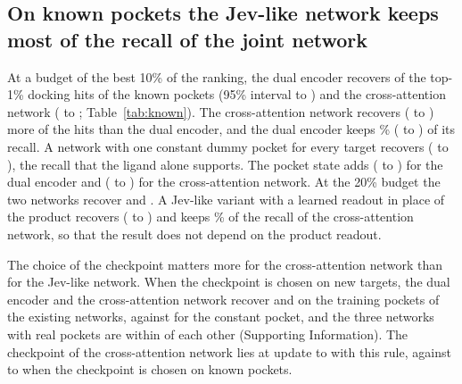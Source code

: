 \subsection{On known pockets the Jev-like network keeps most of the recall of the joint network}

At a budget of the best 10\% of the ranking, the dual encoder recovers \kfDualTen{} of the top-1\% docking hits of the \kfNTargets{} known pockets (95\% interval \kfDualTenLo{} to \kfDualTenHi{}) and the cross-attention network \kfXattnTen{} (\kfXattnTenLo{} to \kfXattnTenHi{}; Table~\ref{tab:known}). The cross-attention network recovers \kfDiffXattnDualTen{} (\kfDiffXattnDualTenLo{} to \kfDiffXattnDualTenHi{}) more of the hits than the dual encoder, and the dual encoder keeps \kfRatioDual{}\% (\kfRatioDualLo{} to \kfRatioDualHi{}) of its recall. A network with one constant dummy pocket for every target recovers \kfConstTen{} (\kfConstTenLo{} to \kfConstTenHi{}), the recall that the ligand alone supports. The pocket state adds \kfDiffDualConstTen{} (\kfDiffDualConstTenLo{} to \kfDiffDualConstTenHi{}) for the dual encoder and \kfDiffXattnXattnConstTen{} (\kfDiffXattnXattnConstTenLo{} to \kfDiffXattnXattnConstTenHi{}) for the cross-attention network. At the 20\% budget the two networks recover \kfDualTwenty{} and \kfXattnTwenty{}. A Jev-like variant with a learned readout in place of the product recovers \kfPooledTen{} (\kfPooledTenLo{} to \kfPooledTenHi{}) and keeps \kfRatioPooled{}\% of the recall of the cross-attention network, so that the result does not depend on the product readout.

The choice of the checkpoint matters more for the cross-attention network than for the Jev-like network. When the checkpoint is chosen on new targets, the dual encoder and the cross-attention network recover \kpDualTen{} and \kpXattnTen{} on the \kpNTargets{} training pockets of the existing networks, against \kpConstTen{} for the constant pocket, and the three networks with real pockets are within \kpSpreadTen{} of each other (Supporting Information). The checkpoint of the cross-attention network lies at update \kpXaBestLo{} to \kpXaBestHi{} with this rule, against \kfXaBestLo{} to \kfXaBestHi{} when the checkpoint is chosen on known pockets.

